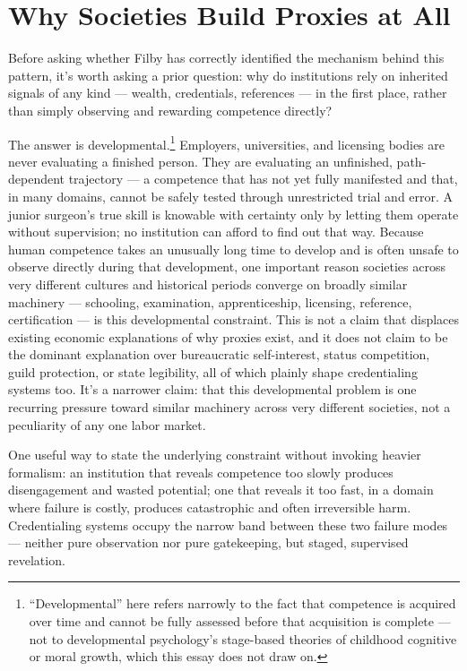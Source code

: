 \documentclass[11pt]{article}
\begin{document}
\section{Why Societies Build Proxies at All}

Before asking whether Filby has correctly identified the mechanism behind this pattern, it's worth asking a prior question: why do institutions rely on inherited signals of any kind --- wealth, credentials, references --- in the first place, rather than simply observing and rewarding competence directly?

The answer is developmental.\footnote{``Developmental'' here refers narrowly to the fact that competence is acquired over time and cannot be fully assessed before that acquisition is complete --- not to developmental psychology's stage-based theories of childhood cognitive or moral growth, which this essay does not draw on.} Employers, universities, and licensing bodies are never evaluating a finished person. They are evaluating an unfinished, path-dependent trajectory --- a competence that has not yet fully manifested and that, in many domains, cannot be safely tested through unrestricted trial and error. A junior surgeon's true skill is knowable with certainty only by letting them operate without supervision; no institution can afford to find out that way. Because human competence takes an unusually long time to develop and is often unsafe to observe directly during that development, one important reason societies across very different cultures and historical periods converge on broadly similar machinery --- schooling, examination, apprenticeship, licensing, reference, certification --- is this developmental constraint. This is not a claim that displaces existing economic explanations of why proxies exist, and it does not claim to be the dominant explanation over bureaucratic self-interest, status competition, guild protection, or state legibility, all of which plainly shape credentialing systems too. It's a narrower claim: that this developmental problem is one recurring pressure toward similar machinery across very different societies, not a peculiarity of any one labor market.

One useful way to state the underlying constraint without invoking heavier formalism: an institution that reveals competence too slowly produces disengagement and wasted potential; one that reveals it too fast, in a domain where failure is costly, produces catastrophic and often irreversible harm. Credentialing systems occupy the narrow band between these two failure modes --- neither pure observation nor pure gatekeeping, but staged, supervised revelation.
\end{document}
